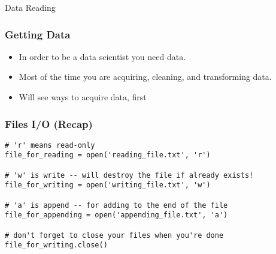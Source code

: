 \begin{frame}
  \begin{center}
    {\Large Data Reading}
  \end{center}
\end{frame}

\begin{frame}[fragile]\frametitle{Getting Data}
\begin{itemize}
\item In order to be a data scientist you need data.
\item Most of the time you are  acquiring, cleaning, and transforming data. 
\item Will see ways to acquire data, first
\end{itemize}
\end{frame}


\begin{frame}[fragile]\frametitle{Files I/O (Recap)}
\begin{lstlisting}
# 'r' means read-only
file_for_reading = open('reading_file.txt', 'r')

# 'w' is write -- will destroy the file if already exists!
file_for_writing = open('writing_file.txt', 'w')

# 'a' is append -- for adding to the end of the file
file_for_appending = open('appending_file.txt', 'a')

# don't forget to close your files when you're done
file_for_writing.close()
\end{lstlisting}
\end{frame}



